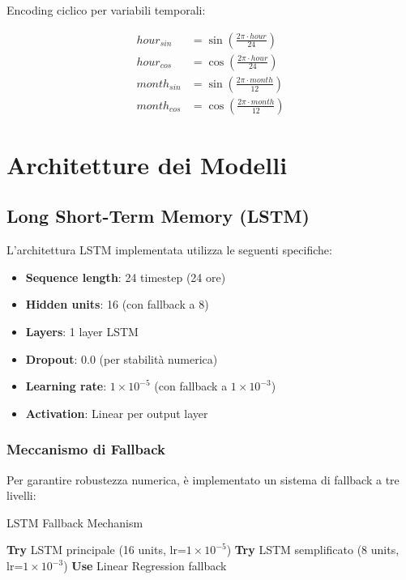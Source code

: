 \documentclass[12pt,a4paper,twoside]{report}
\begin{document}
Encoding ciclico per variabili temporali:

\begin{align}
hour_{sin} &= \sin\left(\frac{2\pi \cdot hour}{24}\right) \\
hour_{cos} &= \cos\left(\frac{2\pi \cdot hour}{24}\right) \\
month_{sin} &= \sin\left(\frac{2\pi \cdot month}{12}\right) \\
month_{cos} &= \cos\left(\frac{2\pi \cdot month}{12}\right)
\end{align}

\section{Architetture dei Modelli}

\subsection{Long Short-Term Memory (LSTM)}

L'architettura LSTM implementata utilizza le seguenti specifiche:

\begin{itemize}
    \item \textbf{Sequence length}: 24 timestep (24 ore)
    \item \textbf{Hidden units}: 16 (con fallback a 8)
    \item \textbf{Layers}: 1 layer LSTM
    \item \textbf{Dropout}: 0.0 (per stabilità numerica)
    \item \textbf{Learning rate}: $1 \times 10^{-5}$ (con fallback a $1 \times 10^{-3}$)
    \item \textbf{Activation}: Linear per output layer
\end{itemize}

\subsubsection{Meccanismo di Fallback}

Per garantire robustezza numerica, è implementato un sistema di fallback a tre livelli:

\begin{algorithm}
\caption{LSTM Fallback Mechanism}
\begin{algorithmic}[1]
\STATE \textbf{Try} LSTM principale (16 units, lr=$1 \times 10^{-5}$)
    \STATE \textbf{Try} LSTM semplificato (8 units, lr=$1 \times 10^{-3}$)
        \STATE \textbf{Use} Linear Regression fallback
    \ENDIF
\ENDIF
\end{algorithmic}
\end{algorithm}
\end{document}

